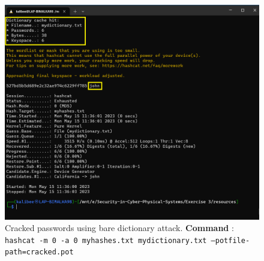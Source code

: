 \documentclass[11pt,letterpaper]{article}
\newenvironment{answer}{\em \color{blue} \begin{adjustwidth}{1cm}{1cm}}{\end{adjustwidth}}
\begin{document}
\begin{enumerate}
\begin{answer}
			\begin{figure}[h]
				\centering
				\includegraphics[width=0.7\columnwidth]{images/cracked_with_norules}
				\caption{Cracked passwords using bare dictionary attack. \textbf{Command} : {\tt hashcat -m 0 -a 0 myhashes.txt mydictionary.txt --potfile-path=cracked.pot}} \label{fig:cracked_with_norules}
			\end{figure}
		\end{answer}
		
	\end{enumerate}
	
\end{document}
